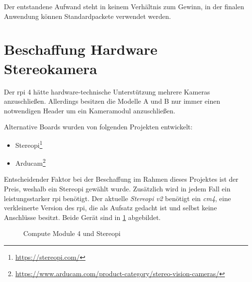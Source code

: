 Der entstandene Aufwand steht in keinem Verhältnis zum Gewinn, in der finalen Anwendung können Standardpackete verwendet werden.

\section{Beschaffung Hardware Stereokamera}
Der \gls{rpi} 4 hätte hardware-technische Unterstützung mehrere Kameras anzuschließen. Allerdings besitzen die Modelle A und B nur immer einen notwendigen Header um ein Kameramodul anzuschließen.

Alternative Boards wurden von folgenden Projekten entwickelt:
\begin{itemize}
    \item Stereopi\footnote{\url{https://stereopi.com/}}
    \item Arducam\footnote{\url{https://www.arducam.com/product-category/stereo-vision-cameras/}}
\end{itemize}

Entscheidender Faktor bei der Beschaffung im Rahmen dieses Projektes ist der Preis, weshalb ein Stereopi gewählt wurde. Zusätzlich wird in jedem Fall ein leistungsstarker \gls{rpi} benötigt. Der aktuelle \textit{Stereopi v2} benötigt ein \textit{\gls{cm4}}, eine verkleinerte Version des \gls{rpi}, die als Aufsatz gedacht ist und selbst keine Anschlüsse besitzt. Beide Gerät sind in \ref{fig:stereopi_intro} abgebildet.

\begin{figure}[!ht]
    \centering
    \hfill
    \hfill
    \caption[Compute Module 4 und Stereopi]{Compute Module 4 und Stereopi}
    \label{fig:stereopi_intro}
\end{figure}

